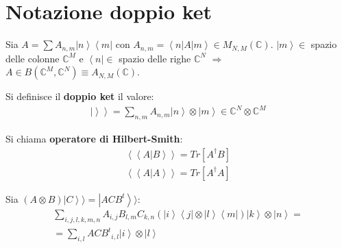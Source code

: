 \section{Notazione doppio ket} %

Sia $A=\sum{A_{n,m}\left |n \right\rangle\left\langle m\right |}$ con $A_{n,m}=\left\langle n|A|m \right\rangle \in M_{N,M}\left(\mathbb{C} \right)$. $\left |m \right\rangle \in$ spazio delle colonne $\mathbb{C} ^M$ e $\left\langle n\right | \in$ spazio delle righe $\mathbb{C} ^N$ $\Longrightarrow $ $A\in B\left(\mathbb{C} ^M,\mathbb{C} ^N\right)\equiv A_{N,M}\left(\mathbb{C} \right)$.

Si definisce il \textbf{doppio ket} il valore:
\begin{equation}\begin{split}
\left.\left | \right\rangle\right\rangle=\sum_{n,m}{A_{n,m}\left |n \right\rangle\otimes \left |m \right\rangle}\in \mathbb{C} ^N\otimes \mathbb{C} ^M
\end{split}\end{equation}

Si chiama \textbf{operatore di Hilbert-Smith}:
\begin{equation}\begin{split}
\left\langle \left \langle A|B \right\rangle\right\rangle=Tr\left[A^{\dag} B\right]\\
\left\langle \left \langle A|A \right\rangle\right\rangle=Tr\left[A^{\dag} A\right]
\end{split}\end{equation}


Sia $\left(A\otimes B\right)\left |C \right\rangle\rangle=\left |ACB^t \right\rangle\rangle$:
\begin{equation}\begin{split}
\sum_{i,j,l,k,m,n}{A_{i,j}B_{l,m}C_{k,n}\left(\left |i \right\rangle\left\langle j\right |\otimes \left |l \right\rangle\left\langle m\right |\right)}\left |k \right\rangle\otimes \left |n \right\rangle=\\
=\sum_{i,l}{ACB^t}_{i,l}\left |i \right\rangle\otimes \left |l \right\rangle
\end{split}\end{equation}

